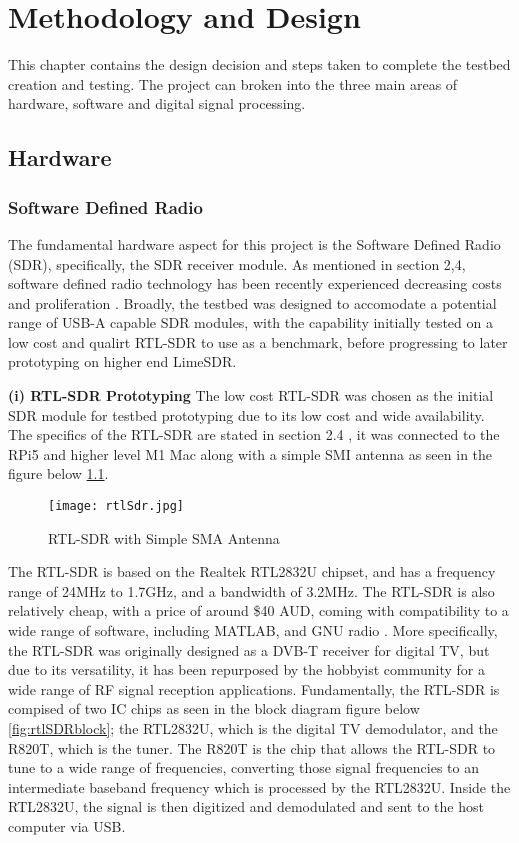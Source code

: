 \chapter{Methodology and Design \label{sec:methodology}}

This chapter contains the design decision and steps taken to complete the testbed creation and testing. The project can broken into the three main areas of hardware, software and digital signal processing. 

\section{Hardware \label{sec:hardware}}

\subsection{Software Defined Radio \label{sec: SDRdongle}}
The fundamental hardware aspect for this project is the Software Defined Radio (SDR), specifically, the SDR receiver module.  As mentioned in section 2,4, software defined radio technology has been recently experienced decreasing costs and proliferation \cite{SDRtheory}. Broadly, the testbed was designed to accomodate a potential range of USB-A capable SDR modules, with the capability initially tested on a low cost and qualirt RTL-SDR to use as a benchmark, before progressing to later prototyping on higher end LimeSDR.

\vspace{0.5cm} \noindent 
\textbf{(i) RTL-SDR Prototyping}
The low cost RTL-SDR was chosen as the initial SDR module for testbed prototyping  due to its low cost and wide availability. The specifics of the RTL-SDR are stated in section 2.4 , it was connected to the RPi5 and higher level M1 Mac along with a simple SMI antenna as seen in the figure below \ref*{fig:rtlSDR}. 

\begin{figure}[htbp]
    \centering
    \texttt{[image: rtlSdr.jpg]}
    \caption{RTL-SDR with Simple SMA Antenna}
    \label{fig:rtlSDR}
\end{figure}

The RTL-SDR is based on the Realtek RTL2832U chipset, and has a frequency range of 24MHz to 1.7GHz, and a bandwidth of 3.2MHz. The RTL-SDR is also relatively cheap, with a price of around \$40 AUD, coming with compatibility to a wide range of software, including MATLAB, and GNU radio \cite{SDRdongle}. More specifically, the RTL-SDR was originally designed as a DVB-T receiver for digital TV, but due to its versatility, it has been repurposed by the hobbyist community for a wide range of RF signal reception applications. Fundamentally, the RTL-SDR is compised of two IC chips as seen in the block diagram figure below \ref*{fig:rtlSDRblock}; the RTL2832U, which is the digital TV demodulator, and the R820T, which is the tuner. The R820T is the chip that allows the RTL-SDR to tune to a wide range of frequencies, converting those signal frequencies to an intermediate baseband frequency which is processed by the RTL2832U. Inside the RTL2832U, the signal is then digitized and demodulated and sent to the host computer via USB.

